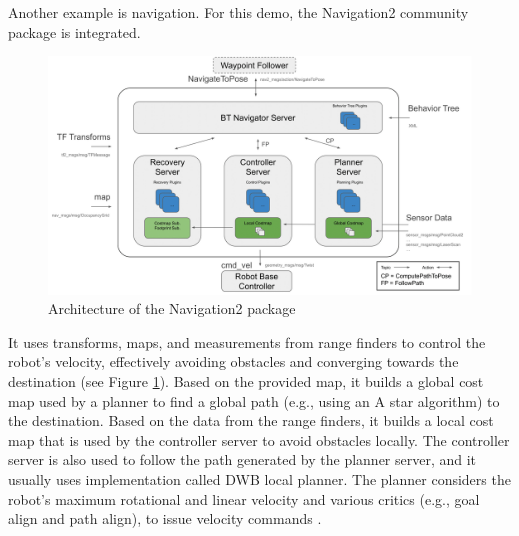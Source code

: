 Another example is navigation.
For this demo, the Navigation2 community package is integrated.  
\begin{figure}[H]
    \centering
    \includegraphics[width=\textwidth]{demos/figures/navigation_overview.png}
    \caption[Architecture of the Navigation2 package]{Architecture of the Navigation2 package\footnotemark}
    \label{fig:demos:navigation_overview}
\end{figure}


It uses transforms, maps, and measurements from range finders to control the robot's velocity, effectively avoiding obstacles and converging towards the destination (see Figure \ref{fig:demos:navigation_overview}).
Based on the provided map, it builds a global cost map used by a planner to find a global path (e.g., using an A star algorithm) to the destination.
Based on the data from the range finders, it builds a local cost map that is used by the controller server to avoid obstacles locally.
The controller server is also used to follow the path generated by the planner server, and it usually uses implementation called DWB local planner.
The planner considers the robot's maximum rotational and linear velocity and various critics (e.g., goal align and path align), to issue velocity commands \cite{macenski_marathon_2020-1}. 


